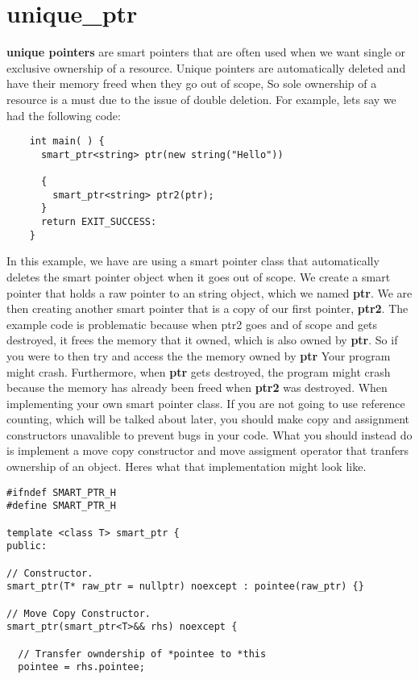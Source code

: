 \documentclass{report}
\begin{document}
\section{unique\_ptr} {
  \textbf{unique pointers} are smart pointers that are often used when we want single or exclusive ownership of a resource. Unique pointers are automatically deleted and have their memory freed when they go out of scope, So sole ownership of a resource is a must due to the issue of double deletion.
  \bigbreak \noindent
  For example, lets say we had the following code:
  \begin{verbatim}
    int main( ) { 
      smart_ptr<string> ptr(new string("Hello"))
      
      {
        smart_ptr<string> ptr2(ptr);
      }
      return EXIT_SUCCESS:
    } 
  \end{verbatim}
  In this example, we have are using a smart pointer class that automatically deletes the smart pointer object when it goes out of scope. We create a smart pointer that holds a raw pointer to an string object, which we named \textbf{ptr}. We are then creating another smart pointer that is a copy of our first pointer, \textbf{ptr2}. The example code is problematic because when ptr2 goes and of scope and gets destroyed, it frees the memory that it owned, which is also owned by \textbf{ptr}. So if you were to then try and access the the memory owned by \textbf{ptr} Your program might crash. Furthermore, when \textbf{ptr} gets destroyed, the program might crash because the memory has already been freed when \textbf{ptr2} was destroyed.
\bigbreak \noindent \bigbreak \noindent
When implementing your own smart pointer class. If you are not going to use reference counting, which will be talked about later, you should make copy and assignment constructors unavalible to prevent bugs in your code. What you should instead do is implement a move copy constructor and move assigment operator that tranfers ownership of an object. Heres what that implementation might look like.
\begin{verbatim}
#ifndef SMART_PTR_H
#define SMART_PTR_H

template <class T> smart_ptr {
public:

// Constructor.
smart_ptr(T* raw_ptr = nullptr) noexcept : pointee(raw_ptr) {}

// Move Copy Constructor.
smart_ptr(smart_ptr<T>&& rhs) noexcept {

  // Transfer owndership of *pointee to *this
  pointee = rhs.pointee; 


\end{verbatim}}
\end{document}
